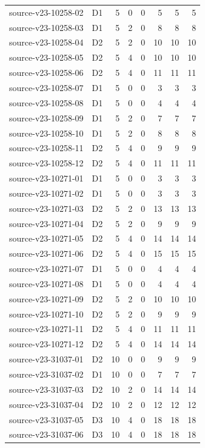 \begin{longtable}{p{}lrrrrrr}
source-v23-10258-02 & D1 & 5 & 0 & 0 & 5 & 5 & 5\\
source-v23-10258-03 & D1 & 5 & 2 & 0 & 8 & 8 & 8\\
source-v23-10258-04 & D2 & 5 & 2 & 0 & 10 & 10 & 10\\
source-v23-10258-05 & D2 & 5 & 4 & 0 & 10 & 10 & 10\\
source-v23-10258-06 & D2 & 5 & 4 & 0 & 11 & 11 & 11\\
source-v23-10258-07 & D1 & 5 & 0 & 0 & 3 & 3 & 3\\
source-v23-10258-08 & D1 & 5 & 0 & 0 & 4 & 4 & 4\\
source-v23-10258-09 & D1 & 5 & 2 & 0 & 7 & 7 & 7\\
source-v23-10258-10 & D1 & 5 & 2 & 0 & 8 & 8 & 8\\
source-v23-10258-11 & D2 & 5 & 4 & 0 & 9 & 9 & 9\\
source-v23-10258-12 & D2 & 5 & 4 & 0 & 11 & 11 & 11\\
source-v23-10271-01 & D1 & 5 & 0 & 0 & 3 & 3 & 3\\
source-v23-10271-02 & D1 & 5 & 0 & 0 & 3 & 3 & 3\\
source-v23-10271-03 & D2 & 5 & 2 & 0 & 13 & 13 & 13\\
source-v23-10271-04 & D2 & 5 & 2 & 0 & 9 & 9 & 9\\
source-v23-10271-05 & D2 & 5 & 4 & 0 & 14 & 14 & 14\\
source-v23-10271-06 & D2 & 5 & 4 & 0 & 15 & 15 & 15\\
source-v23-10271-07 & D1 & 5 & 0 & 0 & 4 & 4 & 4\\
source-v23-10271-08 & D1 & 5 & 0 & 0 & 4 & 4 & 4\\
source-v23-10271-09 & D2 & 5 & 2 & 0 & 10 & 10 & 10\\
source-v23-10271-10 & D2 & 5 & 2 & 0 & 9 & 9 & 9\\
source-v23-10271-11 & D2 & 5 & 4 & 0 & 11 & 11 & 11\\
source-v23-10271-12 & D2 & 5 & 4 & 0 & 14 & 14 & 14\\
source-v23-31037-01 & D2 & 10 & 0 & 0 & 9 & 9 & 9\\
source-v23-31037-02 & D1 & 10 & 0 & 0 & 7 & 7 & 7\\
source-v23-31037-03 & D2 & 10 & 2 & 0 & 14 & 14 & 14\\
source-v23-31037-04 & D2 & 10 & 2 & 0 & 12 & 12 & 12\\
source-v23-31037-05 & D3 & 10 & 4 & 0 & 18 & 18 & 18\\
source-v23-31037-06 & D3 & 10 & 4 & 0 & 18 & 18 & 18\\

\end{longtable}
